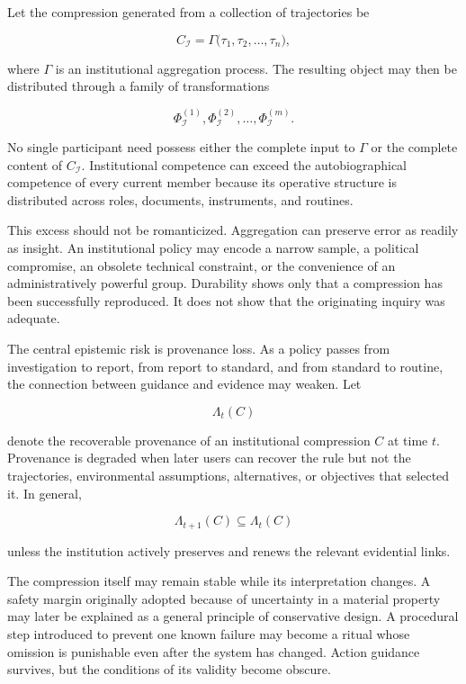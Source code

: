 \documentclass[11pt]{article}
\begin{document}
Let the compression generated from a collection of trajectories be

\[
C_{\mathcal{I}}
=
\Gamma
\bigl(
\tau_1,\tau_2,\ldots,\tau_n
\bigr),
\]

where $\Gamma$ is an institutional aggregation process. The resulting object may then be distributed through a family of transformations

\[
\Phi_{\mathcal{I}}^{(1)},
\Phi_{\mathcal{I}}^{(2)},
\ldots,
\Phi_{\mathcal{I}}^{(m)}.
\]

No single participant need possess either the complete input to $\Gamma$ or the complete content of $C_{\mathcal{I}}$. Institutional competence can exceed the autobiographical competence of every current member because its operative structure is distributed across roles, documents, instruments, and routines.

This excess should not be romanticized. Aggregation can preserve error as readily as insight. An institutional policy may encode a narrow sample, a political compromise, an obsolete technical constraint, or the convenience of an administratively powerful group. Durability shows only that a compression has been successfully reproduced. It does not show that the originating inquiry was adequate.

The central epistemic risk is provenance loss. As a policy passes from investigation to report, from report to standard, and from standard to routine, the connection between guidance and evidence may weaken. Let

\[
\Lambda_t(C)
\]

denote the recoverable provenance of an institutional compression $C$ at time $t$. Provenance is degraded when later users can recover the rule but not the trajectories, environmental assumptions, alternatives, or objectives that selected it. In general,

\[
\Lambda_{t+1}(C)
\subseteq
\Lambda_t(C)
\]

unless the institution actively preserves and renews the relevant evidential links.

The compression itself may remain stable while its interpretation changes. A safety margin originally adopted because of uncertainty in a material property may later be explained as a general principle of conservative design. A procedural step introduced to prevent one known failure may become a ritual whose omission is punishable even after the system has changed. Action guidance survives, but the conditions of its validity become obscure.
\end{document}
